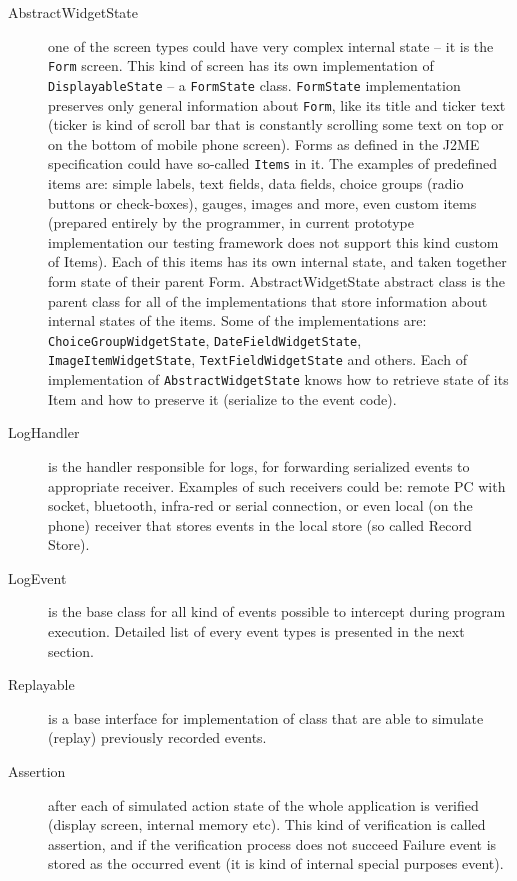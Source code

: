 \begin{description}
\item[AbstractWidgetState] one of the screen types could have very complex internal state -- it is the
\texttt{Form} screen.
This kind of screen has its own implementation of \texttt{DisplayableState} -- a \texttt{FormState} class.
\texttt{FormState} implementation preserves only general information about \texttt{Form},
like its title and ticker text
(ticker is kind of scroll bar that is constantly scrolling some text on top or on the 
bottom of mobile phone screen). Forms as defined in the J2ME specification could have
so-called \texttt{Items} in it. The examples of predefined items are: simple labels, text fields, data fields,
choice groups (radio buttons or check-boxes), gauges, images and more, even custom items
(prepared entirely by the programmer, in current prototype implementation our testing
framework does not support this kind custom of Items). Each of this items has its own internal state, and
taken together form state of their parent Form. AbstractWidgetState abstract class
is the parent class for all of the implementations that store information
about internal states of the items. Some of the implementations are:
\texttt{ChoiceGroupWidgetState}, \texttt{DateFieldWidgetState}, \texttt{ImageItemWidgetState},
\texttt{TextFieldWidgetState} and
others. Each of implementation of \texttt{AbstractWidgetState} knows how to retrieve state
of its Item and how to preserve it (serialize to the event code).

\item[LogHandler] is the handler responsible for logs, for forwarding serialized events to appropriate
receiver. Examples of such receivers could be: remote PC with socket, bluetooth, infra-red
or serial connection, or even local (on the phone) receiver that stores events in the local
store (so called Record Store).

\item[LogEvent] is the base class for all kind of events possible to intercept during
program execution. Detailed list of every event types is presented in the next section.

\item[Replayable] is a base interface for implementation of class that are able to
simulate (replay) previously recorded events.

\item[Assertion] after each of simulated action state of the whole application is verified
(display screen, internal memory etc). This kind of verification is called assertion,
and if the verification process does not succeed Failure event is stored as the 
occurred event (it is kind of internal special purposes event).

\end{description}


